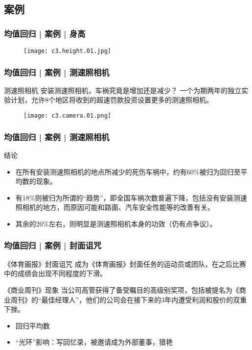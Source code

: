 \subsection{案例}
\begin{frame}
  \frametitle{均值回归 | 案例 | 身高}
  \begin{figure}
    \centering
    \texttt{[image: c3.height.01.jpg]}
  \end{figure}
\end{frame}

\begin{frame}
  \frametitle{均值回归 | 案例 | 测速照相机}
  \begin{block}{测速照相机}
    安装测速照相机，车祸究竟是增加还是减少？
    一个为期两年的独立实验计划，允许8个地区将收到的超速罚款投资设置更多的测速照相机。
  \end{block}
  \begin{figure}
    \centering
    \texttt{[image: c3.camera.01.png]}
  \end{figure}
\end{frame}

\begin{frame}
  \frametitle{均值回归 | 案例 | 测速照相机}
  \begin{block}{结论}
    \begin{itemize}
      \item 在所有安装测速照相机的地点所减少的死伤车祸中，约有60\%被归为回归至平均数的现象。
      \item 有18\%则被归为所谓的“趋势”，即全国车祸次数普遍下降，包括没有安装测速照相机的地方，而原因可能和路面、汽车安全性能等的改善有关。
      \item 其余的20\%左右，则明显是测速照相机本身的功效（仍有点争议）。
    \end{itemize}
  \end{block}
\end{frame}

\begin{frame}
  \frametitle{均值回归 | 案例 | 封面诅咒}
  \begin{block}{《体育画报》封面诅咒}
    成为《体育画报》封面任务的运动员或团队，在之后比赛中的成绩会出现不同程度的下滑。
  \end{block}
  \pause
  \begin{block}{《商业周刊》现象}
    当公司高管获得了备受瞩目的高级别奖项，包括被提名为《商业周刊》的“最佳经理人”，他们的公司会在接下来的3年内遭受利润和股价的双重下挫。
    \begin{itemize}
      \item 回归平均数
      \item “光环”影响：写回忆录，被邀请成为外部董事，猎艳
    \end{itemize}
  \end{block}
\end{frame}

